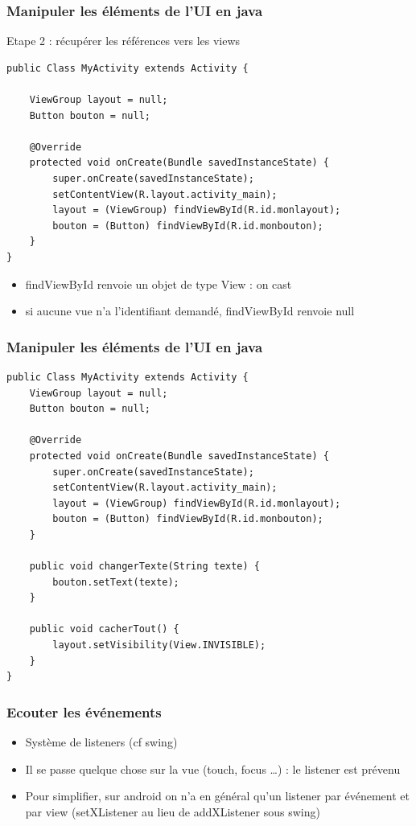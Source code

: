 \documentclass{beamer}
\begin{document}
\begin{frame}[fragile]
\frametitle{Manipuler les éléments de l'UI en java}
Etape 2 : récupérer les références vers les views
\begin{lstlisting}
public Class MyActivity extends Activity {

    ViewGroup layout = null;
    Button bouton = null;

    @Override
    protected void onCreate(Bundle savedInstanceState) {
        super.onCreate(savedInstanceState);
        setContentView(R.layout.activity_main);
        layout = (ViewGroup) findViewById(R.id.monlayout);
        bouton = (Button) findViewById(R.id.monbouton);
    }
}
\end{lstlisting}
\begin{itemize}
    \item findViewById renvoie un objet de type View : on cast
    \item si aucune vue n'a l'identifiant demandé, findViewById renvoie null
 \end{itemize}
\end{frame}
\begin{frame}[fragile]
\frametitle{Manipuler les éléments de l'UI en java}
\begin{lstlisting}
public Class MyActivity extends Activity {
    ViewGroup layout = null;
    Button bouton = null;

    @Override
    protected void onCreate(Bundle savedInstanceState) {
        super.onCreate(savedInstanceState);
        setContentView(R.layout.activity_main);
        layout = (ViewGroup) findViewById(R.id.monlayout);
        bouton = (Button) findViewById(R.id.monbouton);
    }
	
    public void changerTexte(String texte) {
        bouton.setText(texte);
    }
	
    public void cacherTout() {
        layout.setVisibility(View.INVISIBLE);
    }
}
\end{lstlisting}
\end{frame}
\begin{frame}[fragile]
\frametitle{Ecouter les événements}
\begin{itemize}
 \item Système de listeners (cf swing)
 \item Il se passe quelque chose sur la vue (touch, focus \ldots) : le listener
 est prévenu
 \item Pour simplifier, sur android on n'a en général qu'un listener par
 événement et par view (setXListener au lieu de addXListener sous swing)
 \end{itemize}
\end{frame}
\end{document}
